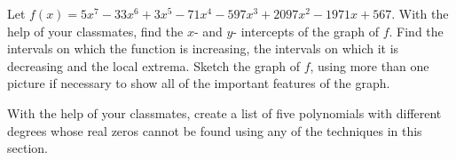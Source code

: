 \documentclass{ximera}
\begin{document}
\begin{problem}
Let $f(x) = 5x^{7} - 33x^{6} + 3x^{5} - 71x^{4} - 597x^{3} + 2097x^{2} - 1971x + 567$.  With the help of your classmates, find the $x$- and $y$- intercepts of the graph of $f$.  Find the intervals on which the function is increasing, the intervals on which it is decreasing and the local extrema.  Sketch the graph of $f$, using more than one picture if necessary to show all of the important features of the graph.  
\end{problem}

\begin{problem}
With the help of your classmates, create a list of five polynomials with different degrees whose real zeros cannot be found using any of the techniques in this section.
\end{problem}
\end{document}
